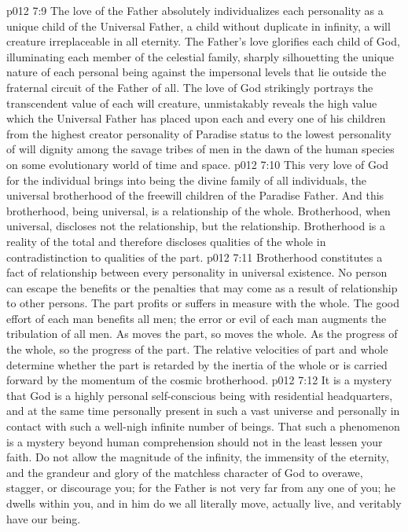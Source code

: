 \vs p012 7:9 The love of the Father absolutely individualizes each personality as a unique child of the Universal Father, a child without duplicate in infinity, a will creature irreplaceable in all eternity. The Father’s love glorifies each child of God, illuminating each member of the celestial family, sharply silhouetting the unique nature of each personal being against the impersonal levels that lie outside the fraternal circuit of the Father of all. The love of God strikingly portrays the transcendent value of each will creature, unmistakably reveals the high value which the Universal Father has placed upon each and every one of his children from the highest creator personality of Paradise status to the lowest personality of will dignity among the savage tribes of men in the dawn of the human species on some evolutionary world of time and space.
\vs p012 7:10 This very love of God for the individual brings into being the divine family of all individuals, the universal brotherhood of the freewill children of the Paradise Father. And this brotherhood, being universal, is a relationship of the whole. Brotherhood, when universal, discloses not the  relationship, but the  relationship. Brotherhood is a reality of the total and therefore discloses qualities of the whole in contradistinction to qualities of the part.
\vs p012 7:11 Brotherhood constitutes a fact of relationship between every personality in universal existence. No person can escape the benefits or the penalties that may come as a result of relationship to other persons. The part profits or suffers in measure with the whole. The good effort of each man benefits all men; the error or evil of each man augments the tribulation of all men. As moves the part, so moves the whole. As the progress of the whole, so the progress of the part. The relative velocities of part and whole determine whether the part is retarded by the inertia of the whole or is carried forward by the momentum of the cosmic brotherhood.
\pc \vs p012 7:12 It is a mystery that God is a highly personal self\hyp{}conscious being with residential headquarters, and at the same time personally present in such a vast universe and personally in contact with such a well\hyp{}nigh infinite number of beings. That such a phenomenon is a mystery beyond human comprehension should not in the least lessen your faith. Do not allow the magnitude of the infinity, the immensity of the eternity, and the grandeur and glory of the matchless character of God to overawe, stagger, or discourage you; for the Father is not very far from any one of you; he dwells within you, and in him do we all literally move, actually live, and veritably have our being.
